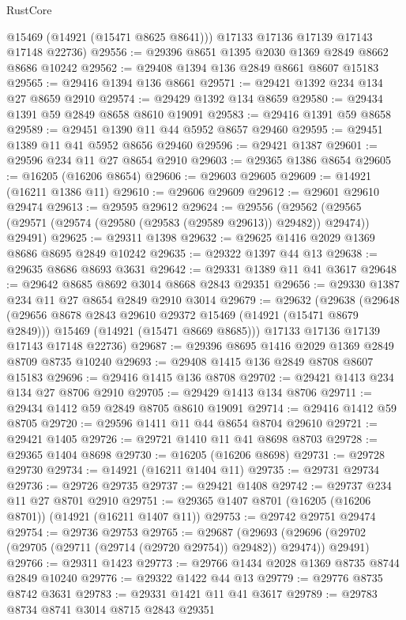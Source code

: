 \begin{lexlean}{RustCore}
\begin{coremodule}
        @15469
        (@14921 (@15471 @8625 @8641)))
      @17133
      @17136
      @17139
      @17143
      @17148
      @22736)
@29556 := @29396 @8651 @1395 @2030 @1369 @2849 @8662 @8686 @10242
@29562 := @29408 @1394 @136 @2849 @8661 @8607 @15183
@29565 := @29416 @1394 @136 @8661
@29571 := @29421 @1392 @234 @134 @27 @8659 @2910
@29574 := @29429 @1392 @134 @8659
@29580 := @29434 @1391 @59 @2849 @8658 @8610 @19091
@29583 := @29416 @1391 @59 @8658
@29589 := @29451 @1390 @11 @44 @5952 @8657 @29460
@29595 := @29451 @1389 @11 @41 @5952 @8656 @29460
@29596 := @29421 @1387
@29601 := @29596 @234 @11 @27 @8654 @2910
@29603 := @29365 @1386 @8654
@29605 := @16205 (@16206 @8654)
@29606 := @29603 @29605
@29609 := @14921 (@16211 @1386 @11)
@29610 := @29606 @29609
@29612 := @29601 @29610 @29474
@29613 := @29595 @29612
@29624 := @29556
    (@29562 (@29565 (@29571 (@29574 (@29580 (@29583 (@29589 @29613)) @29482)) @29474)) @29491)
@29625 := @29311 @1398
@29632 := @29625 @1416 @2029 @1369 @8686 @8695 @2849 @10242
@29635 := @29322 @1397 @44 @13
@29638 := @29635 @8686 @8693 @3631
@29642 := @29331 @1389 @11 @41 @3617
@29648 := @29642 @8685 @8692 @3014 @8668 @2843 @29351
@29656 := @29330 @1387 @234 @11 @27 @8654 @2849 @2910 @3014
@29679 := @29632
    (@29638
      (@29648
        (@29656 @8678 @2843 @29610 @29372 @15469 (@14921 (@15471 @8679 @2849)))
        @15469
        (@14921 (@15471 @8669 @8685)))
      @17133
      @17136
      @17139
      @17143
      @17148
      @22736)
@29687 := @29396 @8695 @1416 @2029 @1369 @2849 @8709 @8735 @10240
@29693 := @29408 @1415 @136 @2849 @8708 @8607 @15183
@29696 := @29416 @1415 @136 @8708
@29702 := @29421 @1413 @234 @134 @27 @8706 @2910
@29705 := @29429 @1413 @134 @8706
@29711 := @29434 @1412 @59 @2849 @8705 @8610 @19091
@29714 := @29416 @1412 @59 @8705
@29720 := @29596 @1411 @11 @44 @8654 @8704 @29610
@29721 := @29421 @1405
@29726 := @29721 @1410 @11 @41 @8698 @8703
@29728 := @29365 @1404 @8698
@29730 := @16205 (@16206 @8698)
@29731 := @29728 @29730
@29734 := @14921 (@16211 @1404 @11)
@29735 := @29731 @29734
@29736 := @29726 @29735
@29737 := @29421 @1408
@29742 := @29737 @234 @11 @27 @8701 @2910
@29751 := @29365 @1407 @8701 (@16205 (@16206 @8701)) (@14921 (@16211 @1407 @11))
@29753 := @29742 @29751 @29474
@29754 := @29736 @29753
@29765 := @29687
    (@29693 (@29696 (@29702 (@29705 (@29711 (@29714 (@29720 @29754)) @29482)) @29474)) @29491)
@29766 := @29311 @1423
@29773 := @29766 @1434 @2028 @1369 @8735 @8744 @2849 @10240
@29776 := @29322 @1422 @44 @13
@29779 := @29776 @8735 @8742 @3631
@29783 := @29331 @1421 @11 @41 @3617
@29789 := @29783 @8734 @8741 @3014 @8715 @2843 @29351

\end{coremodule}
\end{lexlean}
